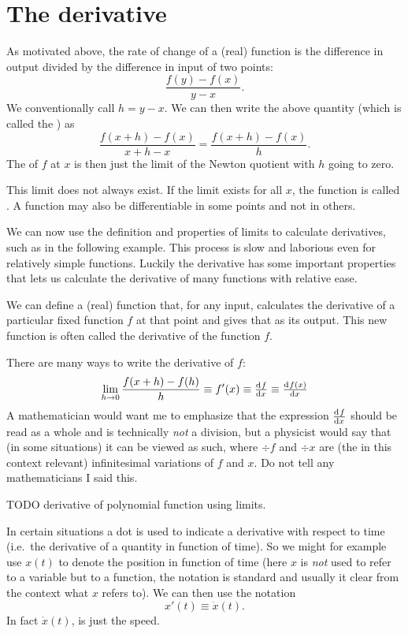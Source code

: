 \section{The derivative}
As motivated above, the rate of change of a (real) function is the difference in output divided by the difference in input of two points:
\[ \frac{f(y) - f(x)}{y-x}. \]
We conventionally call $h = y-x$. We can then write the above quantity (which is called the ) as
\[ \frac{f(x+h) - f(x)}{x+h-x} = \frac{f(x+h) - f(x)}{h}. \]
The  of $f$ at $x$ is then just the limit of the Newton quotient with $h$ going to zero.

This limit does not always exist. If the limit exists for all $x$, the function is called . A function may also be differentiable in some points and not in others.

We can now use the definition and properties of limits to calculate derivatives, such as in the following example. This process is slow and laborious even for relatively simple functions. Luckily the derivative has some important properties that lets us calculate the derivative of many functions with relative ease.

We can define a (real) function that, for any input, calculates the derivative of a particular fixed function $f$ at that point and gives that as its output. This new function is often called the derivative of the function $f$. 

There are many ways to write the derivative of $f$:
\[ \lim_{h\to 0} \frac{f(x+h)-f(h)}{h} \equiv f'(x) \equiv \od{f}{x} \equiv \od{f(x)}{x} \]
A mathematician would want me to emphasize that the expression $\od{f}{x}$ should be read as a whole and is technically \emph{not} a division, but a physicist would say that (in some situations) it can be viewed as such, where $\div{f}$ and $\div{x}$ are (the in this context relevant) infinitesimal variations of $f$ and $x$. Do not tell any mathematicians I said this.

\begin{example}
TODO derivative of polynomial function using limits.
\end{example}

In certain situations a dot is used to indicate a derivative with respect to time (i.e.\ the derivative of a quantity in function of time). So we might for example use $x(t)$ to denote the position in function of time (here $x$ is \emph{not} used to refer to a variable but to a function, the notation is standard and usually it clear from the context what $x$ refers to). We can then use the notation
\[ x'(t) \equiv \dot{x}(t). \]
In fact $\dot{x}(t)$, is just the speed.

